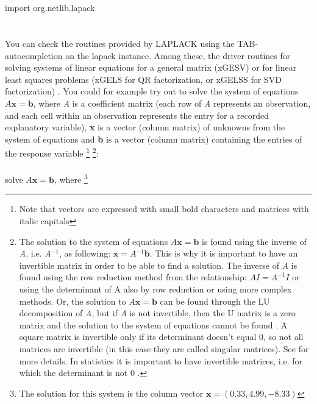 \documentclass {article}
\begin{document}
\\
\\
import org.netlib.lapack\\
\\
\\
You can check the routines provided by LAPLACK using the TAB-autocompletion on the lapack instance. Among these, the driver routines for solving systems of linear equations for a general matrix (xGESV) or for linear least squares problems (xGELS for QR factorization, or xGELSS for SVD factorization) \cite{anderson_lapack_1999}. 
You could for example try out to solve the system of equations $A\textbf{x}=\textbf{b}$, where \textit{A} is a coefficient matrix (each row of \textit{A} represents an observation, and each cell within an observation represents the entry for a recorded explanatory variable), \textbf{x} is a vector (column matrix) of unknowns from the system of equations and \textbf{b} is a vector (column matrix) containing the entries of the response variable \cite{golub_matrix_2013} \cite{nag_ltd._nag_nodate} \cite{seymour_using_2017} \cite{dawkins_pauls_2005} \cite{odersky_programming_2010} \cite{lewis_introduction_2017}
 \footnote{Note that vectors are expressed with small bold characters and matrices with italic capitals} 
\footnote{The solution to the system of equations $A\textbf{x}=\textbf{b}$ is found using the inverse of \textit{A}, i.e. \textit{A$^{-1}$}, as following: $\textbf{x}=\textit{A$^{-1}$}\textbf{b}$.
 This is why it is important to have an invertible matrix in order to be able to find a solution. The inverse of \textit{A} is found using the row reduction method from the relationship: $AI=A^{-1}I$ or using the determinant of A also by row reduction or using more complex methods.
 Or, the solution to $A\textbf{x}=\textbf{b}$ can be found through the LU decomposition of \textit{A}, but if \textit{A} is not invertible, then the U matrix is a zero matrix and the solution to the system of equations cannot be found \cite{icl_javadoc_2017} \cite{intel_mkl_2017}. A square matrix is invertible only if its determinant doesn't equal 0, so not all matrices are invertible (in this case they are called singular matrices). See \cite{dawkins_pauls_2005} for more details. In statistics it is important to have invertible matrices, i.e. for which the determinant is not 0 \cite{quinn_experimental_2002}.}:
\\
\\
solve $A\textbf{x}=\textbf{b}$, where \footnote{The solution for this system is the column vector $\textbf{x}=(0.33, 4.99, -8.33)$}\\
\end{document}
